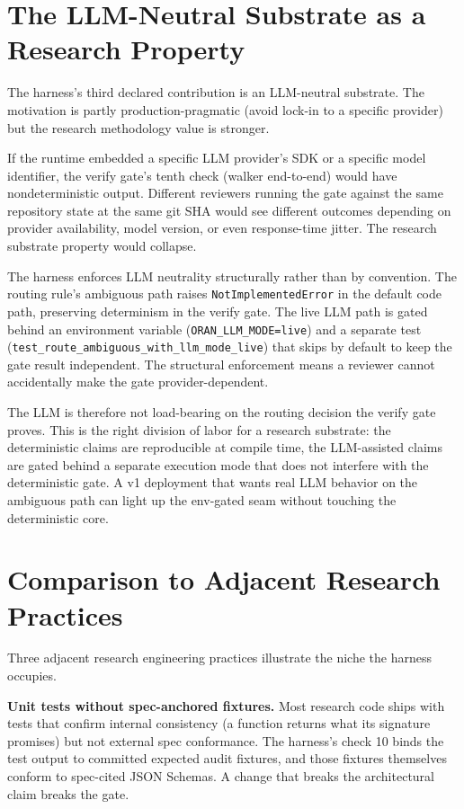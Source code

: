 \documentclass[twocolumn,10pt,a4paper]{article}
\begin{document}
\section{The LLM-Neutral Substrate as a Research Property}
\label{sec:llm}

The harness's third declared contribution is an LLM-neutral substrate. The motivation is partly production-pragmatic (avoid lock-in to a specific provider) but the research methodology value is stronger.

If the runtime embedded a specific LLM provider's SDK or a specific model identifier, the verify gate's tenth check (walker end-to-end) would have nondeterministic output. Different reviewers running the gate against the same repository state at the same git SHA would see different outcomes depending on provider availability, model version, or even response-time jitter. The research substrate property would collapse.

The harness enforces LLM neutrality structurally rather than by convention. The routing rule's ambiguous path raises \texttt{NotImplementedError} in the default code path, preserving determinism in the verify gate. The live LLM path is gated behind an environment variable (\texttt{ORAN\_LLM\_MODE=live}) and a separate test (\texttt{test\_route\_ambiguous\_with\_llm\_mode\_live}) that skips by default to keep the gate result independent. The structural enforcement means a reviewer cannot accidentally make the gate provider-dependent.

The LLM is therefore not load-bearing on the routing decision the verify gate proves. This is the right division of labor for a research substrate: the deterministic claims are reproducible at compile time, the LLM-assisted claims are gated behind a separate execution mode that does not interfere with the deterministic gate. A v1 deployment that wants real LLM behavior on the ambiguous path can light up the env-gated seam without touching the deterministic core.

\section{Comparison to Adjacent Research Practices}
\label{sec:compare}

Three adjacent research engineering practices illustrate the niche the harness occupies.

\textbf{Unit tests without spec-anchored fixtures.} Most research code ships with tests that confirm internal consistency (a function returns what its signature promises) but not external spec conformance. The harness's check 10 binds the test output to committed expected audit fixtures, and those fixtures themselves conform to spec-cited JSON Schemas. A change that breaks the architectural claim breaks the gate.
\end{document}
